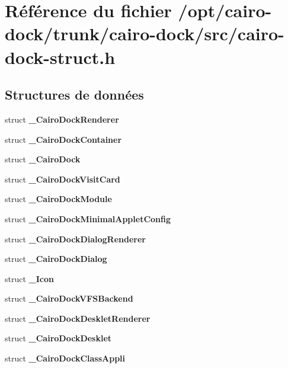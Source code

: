 \section{Référence du fichier /opt/cairo-dock/trunk/cairo-dock/src/cairo-dock-struct.h}
\label{cairo-dock-struct_8h}
\subsection*{Structures de données}
\begin{CompactItemize}
\item 
struct {\bf \_\-CairoDockRenderer}
\item 
struct {\bf \_\-CairoDockContainer}
\item 
struct {\bf \_\-CairoDock}
\item 
struct {\bf \_\-CairoDockVisitCard}
\item 
struct {\bf \_\-CairoDockModule}
\item 
struct {\bf \_\-CairoDockMinimalAppletConfig}
\item 
struct {\bf \_\-CairoDockDialogRenderer}
\item 
struct {\bf \_\-CairoDockDialog}
\item 
struct {\bf \_\-Icon}
\item 
struct {\bf \_\-CairoDockVFSBackend}
\item 
struct {\bf \_\-CairoDockDeskletRenderer}
\item 
struct {\bf \_\-CairoDockDesklet}
\item 
struct {\bf \_\-CairoDockClassAppli}
\end{CompactItemize}
